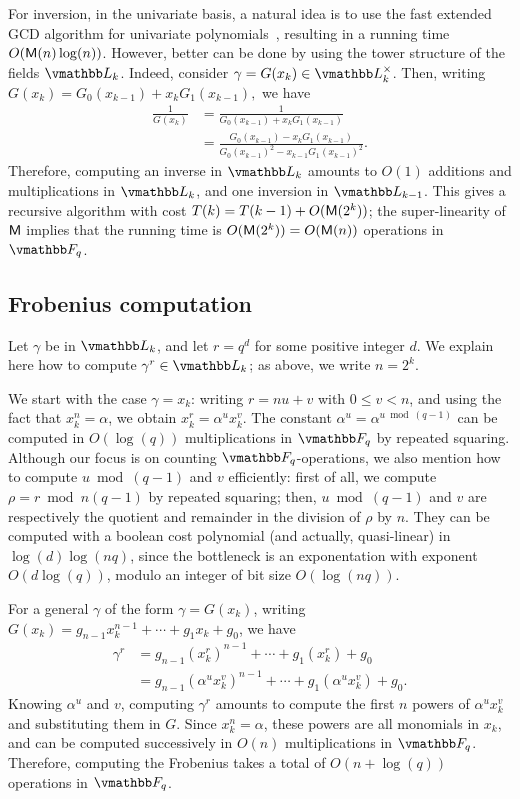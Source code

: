 For inversion, in the univariate basis, a natural idea is to use the
fast extended GCD algorithm for univariate
polynomials~\cite[Ch.~11]{GaGe03}, resulting in a running time
$O(\mathsf{M}(n)\log(n))$. However, better can be done by using the tower
structure of the fields $\L_k$.  Indeed, consider $\gamma=G(x_k) \in
\L_k^\times$. Then, writing $G(x_k) = G_0(x_{k-1}) + x_k
G_1(x_{k-1}),$ we have
\begin{align*}
\frac{1}{G(x_k)}
&= \frac{1}{G_0(x_{k - 1}) + x_kG_1(x_{k - 1})}\\ 
&= \frac{G_0(x_{k-1}) - x_kG_1(x_{k-1})}{G_0(x_{k - 1})^2 - x_{k - 1}G_1(x_{k - 1})^2}.
\end{align*}
Therefore, computing an inverse in $\L_k$ amounts to $O(1)$ additions
and multiplications in $\L_k$, and one inversion in $\L_{k-1}$. This
gives a recursive algorithm with cost $T(k) = T(k-1) + O(\mathsf{M}(2^k))$;
the super-linearity of $\mathsf{M}$ implies that the running time is
$O(\mathsf{M}(2^k))=O(\mathsf{M}(n))$ operations in $\F_q$.


\subsection{Frobenius computation}

Let $\gamma$ be in $\L_k$, and let $r = q^d$ for some positive integer
$d$. We explain here how to compute $\gamma^r \in \L_k$; as above,
we write $n=2^k$.

We start with the case $\gamma=x_k$: writing $r = n u + v$ with $0 \le
v < n$, and using the fact that $x_k^n=\alpha$, we obtain $x_k^r =
\alpha^u x_k^v$. The constant $\alpha^u = \alpha^{u \bmod (q-1)}$ can
be computed in $O(\log(q))$ multiplications in $\F_q$ by repeated
squaring.  Although our focus is on counting $\F_q$-operations, we
also mention how to compute $u \bmod (q-1)$ and $v$ efficiently: first
of all, we compute $\rho=r\bmod n(q-1)$ by repeated squaring; then, $u
\bmod (q-1)$ and $v$ are respectively the quotient and remainder in
the division of $\rho$ by $n$. They can be computed with a boolean
cost polynomial (and actually, quasi-linear) in $\log(d)\log(nq)$,
since the bottleneck is an exponentation with exponent $O(d \log(q))$,
modulo an integer of bit size $O(\log(nq))$.

For a general $\gamma$ of the form $\gamma=G(x_k)$, 
writing $G(x_k) = g_{n - 1}x_k^{n - 1} + \cdots + g_1x_k + g_0$, we have
\begin{align*}
\gamma^r 
&= g_{n - 1}(x_k^r)^{n - 1} + \cdots + g_1(x_k^r) + g_0 \\
&= g_{n - 1}(\alpha^u x_k^v)^{n - 1} + \cdots + g_1(\alpha^u x_k^v) + g_0.
\end{align*}
Knowing $\alpha^u$ and $v$, computing $\gamma^r$ amounts to compute
the first $n$ powers of $\alpha^u x_k^v$ and substituting them in
$G$. Since $x_k^{n}=\alpha$, these powers are all monomials in $x_k$,
and can be computed successively in $O(n)$ multiplications in
$\F_q$. Therefore, computing the Frobenius takes a total of
$O(n+\log(q))$ operations in $\F_q$.


